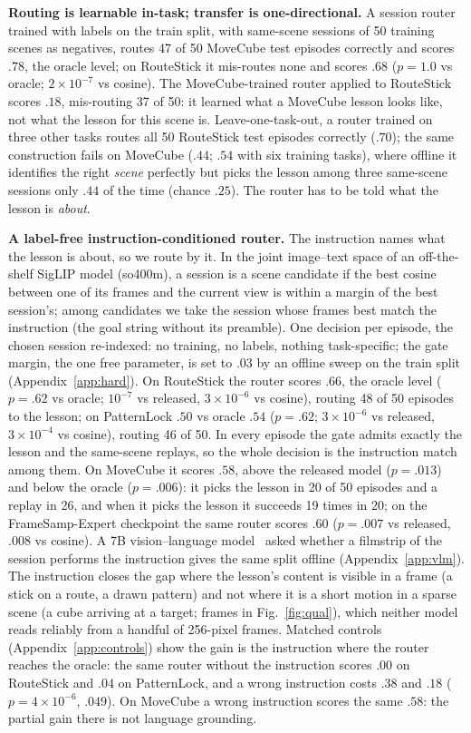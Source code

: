 \documentclass{article}
\begin{document}
\textbf{Routing is learnable in-task; transfer is one-directional.} A session router trained with labels on the train split, with same-scene sessions of 50 training scenes as negatives, routes 47 of 50 MoveCube test episodes correctly and scores $.78$, the oracle level; on RouteStick it mis-routes none and scores $.68$ ($p=1.0$ vs oracle; $2\times10^{-7}$ vs cosine). The MoveCube-trained router applied to RouteStick scores $.18$, mis-routing 37 of 50: it learned what a MoveCube lesson looks like, not what the lesson for this scene is. Leave-one-task-out, a router trained on three other tasks routes all 50 RouteStick test episodes correctly ($.70$); the same construction fails on MoveCube ($.44$; $.54$ with six training tasks), where offline it identifies the right \emph{scene} perfectly but picks the lesson among three same-scene sessions only $.44$ of the time (chance $.25$). The router has to be told what the lesson is \emph{about}.

\textbf{A label-free instruction-conditioned router.} The instruction names what the lesson is about, so we route by it. In the joint image--text space of an off-the-shelf SigLIP model (so400m), a session is a scene candidate if the best cosine between one of its frames and the current view is within a margin of the best session's; among candidates we take the session whose frames best match the instruction (the goal string without its preamble). One decision per episode, the chosen session re-indexed: no training, no labels, nothing task-specific; the gate margin, the one free parameter, is set to $.03$ by an offline sweep on the train split (Appendix~\ref{app:hard}). On RouteStick the router scores $.66$, the oracle level ($p=.62$ vs oracle; $10^{-7}$ vs released, $3\times10^{-6}$ vs cosine), routing 48 of 50 episodes to the lesson; on PatternLock $.50$ vs oracle $.54$ ($p=.62$; $3\times10^{-6}$ vs released, $3\times10^{-4}$ vs cosine), routing 46 of 50. In every episode the gate admits exactly the lesson and the same-scene replays, so the whole decision is the instruction match among them. On MoveCube it scores $.58$, above the released model ($p=.013$) and below the oracle ($p=.006$): it picks the lesson in 20 of 50 episodes and a replay in 26, and when it picks the lesson it succeeds 19 times in 20; on the FrameSamp-Expert checkpoint the same router scores $.60$ ($p=.007$ vs released, $.008$ vs cosine). A 7B vision--language model~\cite{qwen25vl} asked whether a filmstrip of the session performs the instruction gives the same split offline (Appendix~\ref{app:vlm}). The instruction closes the gap where the lesson's content is visible in a frame (a stick on a route, a drawn pattern) and not where it is a short motion in a sparse scene (a cube arriving at a target; frames in Fig.~\ref{fig:qual}), which neither model reads reliably from a handful of 256-pixel frames. Matched controls (Appendix~\ref{app:controls}) show the gain is the instruction where the router reaches the oracle: the same router without the instruction scores $.00$ on RouteStick and $.04$ on PatternLock, and a wrong instruction costs $.38$ and $.18$ ($p=4\times10^{-6}$, $.049$). On MoveCube a wrong instruction scores the same $.58$: the partial gain there is not language grounding.
\end{document}
